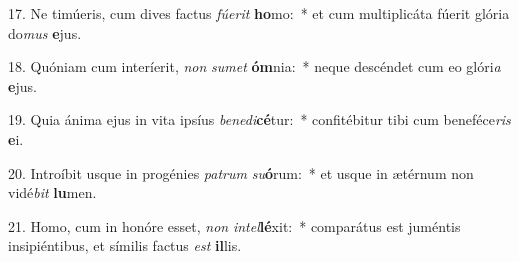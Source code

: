 17. Ne timúeris, cum dives factus \textit{fú}\textit{e}\textit{rit} \textbf{ho}mo:~*  et cum multiplicáta fúerit glória do\textit{mus} \textbf{e}jus.\

18. Quóniam cum interíerit, \textit{non} \textit{su}\textit{met} \textbf{óm}nia:~*  neque descéndet cum eo glóri\textit{a} \textbf{e}jus.\

19. Quia ánima ejus in vita ipsíus \textit{be}\textit{ne}\textit{di}\textbf{cé}tur:~*  confitébitur tibi cum beneféce\textit{ris} \textbf{e}i.\

20. Introíbit usque in progénies \textit{pa}\textit{trum} \textit{su}\textbf{ó}rum:~*  et usque in ætérnum non vidé\textit{bit} \textbf{lu}men.\

21. Homo, cum in honóre esset, \textit{non} \textit{in}\textit{tel}\textbf{lé}xit:~*  comparátus est juméntis insipiéntibus, et símilis factus \textit{est} \textbf{il}lis.\

